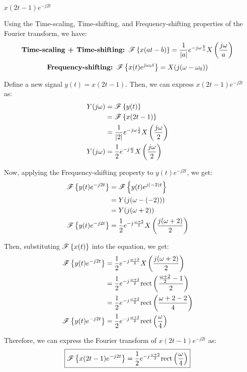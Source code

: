 \documentclass[a4paper, 10pt]{article}
\begin{document}
\begin{tosubmit}
\begin{subproblems}[start=4]
    \item \( x(2t-1) e^{-j2t} \)
\end{subproblems}

\par\noindent\submitsolution
Using the Time-scaling, Time-shifting, and Frequency-shifting properties of the Fourier transform, we have:
\[
    \textbf{Time-scaling + Time-shifting: } \mathscr{F} \left\{ x(at - b) \right\} = \frac{1}{|a|} e^{-j\omega \frac{b}{a}} X\left( \frac{j\omega}{a} \right)
\]
\[
    \textbf{Frequency-shifting: } \mathscr{F} \left\{ x(t) e^{j\omega_0 t} \right\} = X(j(\omega - \omega_0))
\]

Define a new signal \( y(t) = x(2t - 1) \). Then, we can express \( x(2t - 1) e^{-j2t} \) as:
\begin{align*}
    Y(j\omega) &= \mathscr{F} \left\{ y(t) \right\} \\
    &= \mathscr{F} \left\{ x(2t - 1) \right\} \\
    &= \frac{1}{|2|} e^{-j\omega \frac{1}{2}} X\left( \frac{j\omega}{2} \right) \\
    Y(j\omega) &= \frac{1}{2} e^{-j\frac{\omega}{2}} X\left( \frac{j\omega}{2} \right)
\end{align*}

Now, applying the Frequency-shifting property to \( y(t) e^{-j2t} \), we get:
\begin{align*}  
    \mathscr{F} \left\{ y(t) e^{-j2t} \right\} &= \mathscr{F} \left\{ y(t) e^{j(-2)t} \right\} \\
    &= Y(j(\omega - (-2))) \\
    &= Y(j(\omega + 2)) \\
    \mathscr{F} \left\{ y(t) e^{-j2t} \right\} &= \frac{1}{2} e^{-j\frac{\omega + 2}{2}} X\left( \frac{j(\omega + 2)}{2} \right)
\end{align*}

Then, substituting \( \mathscr{F} \left\{ x(t) \right\} \) into the equation, we get:
\begin{align*}  
    \mathscr{F} \left\{ y(t) e^{-j2t} \right\} &= \frac{1}{2} e^{-j\frac{\omega + 2}{2}} X\left( \frac{j(\omega + 2)}{2} \right) \\
    &= \frac{1}{2} e^{-j\frac{\omega + 2}{2}} \textrm{rect} \left( \frac{\frac{\omega + 2}{2} - 1}{2} \right) \\
    &= \frac{1}{2} e^{-j\frac{\omega + 2}{2}} \textrm{rect} \left( \frac{\omega + 2 - 2}{4} \right) \\
    \mathscr{F} \left\{ y(t) e^{-j2t} \right\} &= \frac{1}{2} e^{-j\frac{\omega + 2}{2}} \textrm{rect} \left( \frac{\omega}{4} \right)
\end{align*}

Therefore, we can express the Fourier transform of \( x(2t - 1) e^{-j2t} \) as:
\[ \boxed{
    \mathscr{F} \left\{ x(2t - 1) e^{-j2t} \right\} = \frac{1}{2} e^{-j\frac{\omega + 2}{2}} \textrm{rect} \left( \frac{\omega}{4} \right)
} \]
\end{tosubmit}
\end{document}
